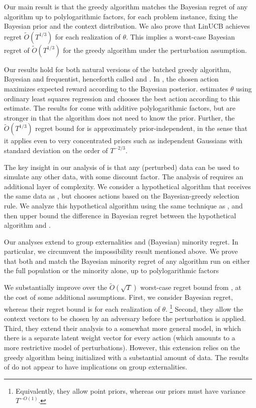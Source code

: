 Our main result is that the greedy algorithm matches the Bayesian regret of any algorithm up to polylogarithmic factors, for each problem instance, fixing the Bayesian prior and the context distribution. We also prove that LinUCB achieves regret $\tilde{O}(T^{1/3})$ for each realization of $\theta$. This implies a worst-case Bayesian regret of $\tilde{O}(T^{1/3})$ for the greedy algorithm under the perturbation assumption. 

Our results hold for both natural versions of the batched greedy algorithm, Bayesian and frequentist, henceforth called \BayesGreedy and \FreqGreedy. In \BayesGreedy, the chosen action maximizes expected reward according to the Bayesian posterior. \FreqGreedy estimates $\theta$ using ordinary least squares regression and chooses the best action according to this estimate. The results for \FreqGreedy come with additive polylogarithmic factors, but are stronger in that the algorithm does not need to know the prior. Further, the $\tilde{O}(T^{1/3})$ regret bound for \FreqGreedy is approximately prior-independent, in the sense that it applies even to very concentrated priors such as independent Gaussians with standard deviation on the order of $T^{-2/3}$.

The key insight in our analysis of \BayesGreedy is that any (perturbed) data can be used to simulate any other data, with some discount factor. The analysis of \FreqGreedy requires an additional layer of complexity. We consider a hypothetical algorithm that receives the same data as \FreqGreedy, but chooses actions based on the Bayesian-greedy selection rule. We analyze this hypothetical algorithm using the same technique as \BayesGreedy, and then upper bound the difference in Bayesian regret between the hypothetical algorithm and \FreqGreedy.

Our analyses extend to group externalities and (Bayesian) minority regret. In particular, we circumvent the impossibility result mentioned above. We prove that both \BayesGreedy and \FreqGreedy match the Bayesian minority regret of any algorithm run on either the full population or the minority alone, up to polylogarithmic factors

 We substantially improve over the $\tilde{O}(\sqrt{T})$ worst-case regret bound from \citet{kannan2018smoothed}, at the cost of some additional assumptions. First, we consider Bayesian regret, whereas their regret bound is for each realization of $\theta$.%
\footnote{Equivalently, they allow point priors, whereas our priors must have variance $T^{-O(1)}$.} Second, they allow the context vectors to be chosen by an adversary before the perturbation is applied. Third, they extend their analysis to a somewhat more general model, in which there is a separate latent weight vector for every action (which amounts to a more restrictive model of perturbations). However, this extension relies on the greedy algorithm being initialized with a substantial amount of data. The results of \citet{kannan2018smoothed} do not appear to have implications on group externalities.

